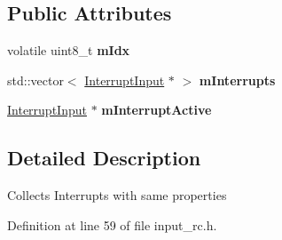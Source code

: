 \subsection*{Public Attributes}
\begin{DoxyCompactItemize}
\item 
volatile uint8\+\_\+t {\bfseries m\+Idx}\hypertarget{classSPMB_1_1InterruptGroup_a390d762b5aaa808d07aef963fa5296ed}{}\label{classSPMB_1_1InterruptGroup_a390d762b5aaa808d07aef963fa5296ed}

\item 
std\+::vector$<$ \hyperlink{classSPMB_1_1InterruptInput}{Interrupt\+Input} $\ast$ $>$ {\bfseries m\+Interrupts}\hypertarget{classSPMB_1_1InterruptGroup_a0eff897d66e69f20cbc4c83d05a64293}{}\label{classSPMB_1_1InterruptGroup_a0eff897d66e69f20cbc4c83d05a64293}

\item 
\hyperlink{classSPMB_1_1InterruptInput}{Interrupt\+Input} $\ast$ {\bfseries m\+Interrupt\+Active}\hypertarget{classSPMB_1_1InterruptGroup_a894e60cb901974f3b2731c5638245340}{}\label{classSPMB_1_1InterruptGroup_a894e60cb901974f3b2731c5638245340}

\end{DoxyCompactItemize}


\subsection{Detailed Description}
Collects Interrupts with same properties 

Definition at line 59 of file input\+\_\+rc.\+h.

